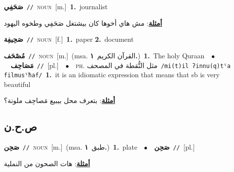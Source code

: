 \documentclass[10pt,a4paper,twoside]{article} %
\begin{document}
\begin{multicols}{2}
{\setlength\topsep{0pt}\textbf{\foreignlanguage{arabic}{صَحَفِي}}\ {\color{gray}\texttt{//}\color{black}}\ \textsc{noun}\ [m.]\ \textbf{1.}~journalist\  \begin{flushright}\color{gray}\foreignlanguage{arabic}{\textbf{\underline{\foreignlanguage{arabic}{أمثلة}}}: مش هاي أخوها كان بيشتغل صَحَفِي وطخوه اليهود}\end{flushright}\color{black}} \vspace{2mm}

{\setlength\topsep{0pt}\textbf{\foreignlanguage{arabic}{صَحِيفِة}}\ {\color{gray}\texttt{//}\color{black}}\ \textsc{noun}\ [f.]\ \textbf{1.}~paper  \textbf{2.}~document\ } \vspace{2mm}

{\setlength\topsep{0pt}\textbf{\foreignlanguage{arabic}{مُصْحَف}}\ {\color{gray}\texttt{//}\color{black}}\ \textsc{noun}\ [m.]\ \color{gray}(msa. \foreignlanguage{arabic}{القرآن الكريم}~\foreignlanguage{arabic}{\textbf{١.}})\color{black}\ \textbf{1.}~The holy Quraan\ \ $\bullet$\ \ \setlength\topsep{0pt}\textbf{\foreignlanguage{arabic}{مَصَاحِف}}\ {\color{gray}\texttt{//}\color{black}}\ [pl.]\ \ $\bullet$\ \ \textsc{ph.} \color{gray} \foreignlanguage{arabic}{مثل النُّقطة في المصحف}\color{black}\ {\color{gray}\texttt{/{\sffamily mi(t)il ʔinnu(q)tˤa filmusˤħaf}/}\color{black}}\ \textbf{1.}~it is an idiomatic expression that means that sb is very beautiful\  \begin{flushright}\color{gray}\foreignlanguage{arabic}{\textbf{\underline{\foreignlanguage{arabic}{أمثلة}}}: بتعرف محل بيبيع مَصاحِف ملونة؟}\end{flushright}\color{black}} \vspace{2mm}

\vspace{-3mm}
\subsection*{\color{blue}\foreignlanguage{arabic}{ص.ح.ن}\color{blue}{}} 

{\setlength\topsep{0pt}\textbf{\foreignlanguage{arabic}{صَحِن}}\ {\color{gray}\texttt{//}\color{black}}\ \textsc{noun}\ [m.]\ \color{gray}(msa. \foreignlanguage{arabic}{طبق}~\foreignlanguage{arabic}{\textbf{١.}})\color{black}\ \textbf{1.}~plate\ \ $\bullet$\ \ \setlength\topsep{0pt}\textbf{\foreignlanguage{arabic}{صَحِن}}\ {\color{gray}\texttt{//}\color{black}}\ [pl.]\  \begin{flushright}\color{gray}\foreignlanguage{arabic}{\textbf{\underline{\foreignlanguage{arabic}{أمثلة}}}: هات الصحون من النملية}\end{flushright}\color{black}} \vspace{2mm}


\end{multicols}
\end{document}
